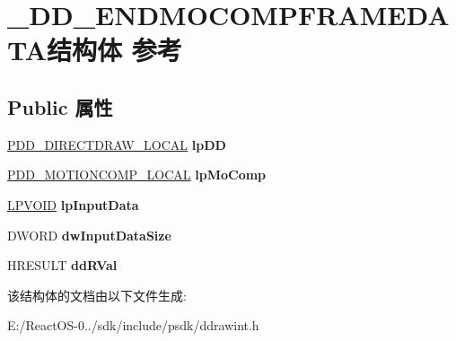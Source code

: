 \hypertarget{struct___d_d___e_n_d_m_o_c_o_m_p_f_r_a_m_e_d_a_t_a}{}\section{\+\_\+\+D\+D\+\_\+\+E\+N\+D\+M\+O\+C\+O\+M\+P\+F\+R\+A\+M\+E\+D\+A\+T\+A结构体 参考}
\label{struct___d_d___e_n_d_m_o_c_o_m_p_f_r_a_m_e_d_a_t_a}
\subsection*{Public 属性}
\begin{DoxyCompactItemize}
\item 
\mbox{\label{struct___d_d___e_n_d_m_o_c_o_m_p_f_r_a_m_e_d_a_t_a_a9a82fbf4484b521e69674077e99e85f4}} 
\hyperlink{struct___d_d___d_i_r_e_c_t_d_r_a_w___l_o_c_a_l}{P\+D\+D\+\_\+\+D\+I\+R\+E\+C\+T\+D\+R\+A\+W\+\_\+\+L\+O\+C\+AL} {\bfseries lp\+DD}
\item 
\mbox{\label{struct___d_d___e_n_d_m_o_c_o_m_p_f_r_a_m_e_d_a_t_a_a822acc9101a8f1a4e69a5b3a151adb2d}} 
\hyperlink{struct_d_d___m_o_t_i_o_n_c_o_m_p___l_o_c_a_l}{P\+D\+D\+\_\+\+M\+O\+T\+I\+O\+N\+C\+O\+M\+P\+\_\+\+L\+O\+C\+AL} {\bfseries lp\+Mo\+Comp}
\item 
\mbox{\label{struct___d_d___e_n_d_m_o_c_o_m_p_f_r_a_m_e_d_a_t_a_a0d515e5c4a7df7b96addc111b68b59c9}} 
\hyperlink{interfacevoid}{L\+P\+V\+O\+ID} {\bfseries lp\+Input\+Data}
\item 
\mbox{\label{struct___d_d___e_n_d_m_o_c_o_m_p_f_r_a_m_e_d_a_t_a_a3928d512643d99a1d052fe354046ac44}} 
D\+W\+O\+RD {\bfseries dw\+Input\+Data\+Size}
\item 
\mbox{\label{struct___d_d___e_n_d_m_o_c_o_m_p_f_r_a_m_e_d_a_t_a_a39861c921b0b6b2b0e9bee1b2841f439}} 
H\+R\+E\+S\+U\+LT {\bfseries dd\+R\+Val}
\end{DoxyCompactItemize}


该结构体的文档由以下文件生成\+:\begin{DoxyCompactItemize}
\item 
E\+:/\+React\+O\+S-\/0../sdk/include/psdk/ddrawint.\+h\end{DoxyCompactItemize}
